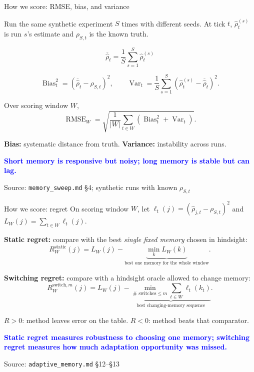 \documentclass[aspectratio=169,11pt]{beamer}
\newcommand{\good}[1]{\textcolor{blue}{\textbf{#1}}}
\newcommand{\src}[1]{\vfill{\tiny\color{gray}Source: #1}}
\begin{document}
\begin{frame}{How we score: RMSE, bias, and variance}

  Run the same synthetic experiment $S$ times with different seeds.
  At tick $t$, $\widehat\rho_t^{(s)}$ is run $s$'s estimate and
  $\rho_{S,t}$ is the known truth.

  \[
    \overline{\widehat\rho}_t
      =\frac1S\sum_{s=1}^S \widehat\rho_t^{(s)}
  \]

  \[
    \operatorname{Bias}_t^2
      =(\overline{\widehat\rho}_t-\rho_{S,t})^2,
    \qquad
    \operatorname{Var}_t
      =\frac1S\sum_{s=1}^S
      (\widehat\rho_t^{(s)}-\overline{\widehat\rho}_t)^2.
  \]

  Over scoring window $W$,
  \[
    \operatorname{RMSE}_W
      =
      \sqrt{
        \frac1{|W|}
        \sum_{t\in W}
        \left(
          \operatorname{Bias}_t^2+\operatorname{Var}_t
        \right)
      }.
  \]

  \small
  \textbf{Bias:} systematic distance from truth. \qquad
  \textbf{Variance:} instability across runs.

  \medskip
  \good{Short memory is responsive but noisy; long memory is stable but can lag.}

  \src{\texttt{memory\_sweep.md} \S4;
       synthetic runs with known $\rho_{S,t}$}
\end{frame}

\begin{frame}{How we score: regret}
  \small
  On scoring window $W$, let
  $\ell_t(j)=(\widehat\rho_{j,t}-\rho_{S,t})^2$ and
  $L_W(j)=\sum_{t\in W}\ell_t(j)$.

  \smallskip

  \textbf{Static regret:}
  compare with the best \emph{single fixed memory} chosen in hindsight:
  \[
    R_W^{\mathrm{static}}(j)
      =
      L_W(j)
      -
      \underbrace{\min_k L_W(k)}_{\text{best one memory for the whole window}}.
  \]

  \textbf{Switching regret:}
  compare with a hindsight oracle allowed to change memory:
  \[
    R_W^{\mathrm{switch},m}(j)
      =
      L_W(j)
      -
      \underbrace{
      \min_{\#\text{ switches}\le m}
      \sum_{t\in W}\ell_t(k_t)
      }_{\text{best changing-memory sequence}}.
  \]

  \smallskip
  $R>0$: method leaves error on the table. \qquad
  $R<0$: method beats that comparator.

  \good{Static regret measures robustness to choosing one memory;
        switching regret measures how much adaptation opportunity was missed.}

  \src{\texttt{adaptive\_memory.md} \S12--\S13}
\end{frame}
\end{document}
